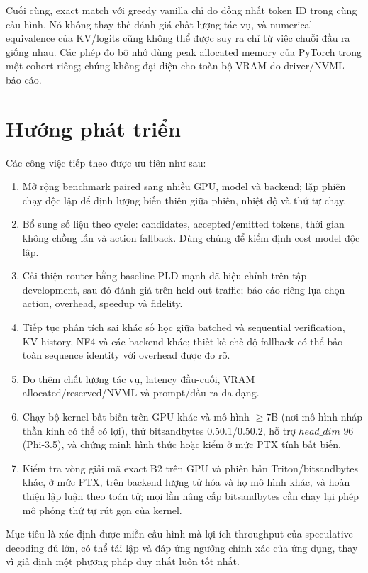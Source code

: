 Cuối cùng, exact match với greedy vanilla chỉ đo đồng nhất token ID trong cùng cấu hình. Nó không thay thế đánh giá chất lượng tác vụ, và numerical equivalence của KV/logits cũng không thể được suy ra chỉ từ việc chuỗi đầu ra giống nhau. Các phép đo bộ nhớ dùng peak allocated memory của PyTorch trong một cohort riêng; chúng không đại diện cho toàn bộ VRAM do driver/NVML báo cáo.

\section{Hướng phát triển}

Các công việc tiếp theo được ưu tiên như sau:
\begin{enumerate}
    \item Mở rộng benchmark paired sang nhiều GPU, model và backend; lặp phiên chạy độc lập để định lượng biến thiên giữa phiên, nhiệt độ và thứ tự chạy.
    \item Bổ sung số liệu theo cycle: candidates, accepted/emitted tokens, thời gian không chồng lấn và action fallback. Dùng chúng để kiểm định cost model độc lập.
    \item Cải thiện router bằng baseline PLD mạnh đã hiệu chỉnh trên tập development, sau đó đánh giá trên held-out traffic; báo cáo riêng lựa chọn action, overhead, speedup và fidelity.
    \item Tiếp tục phân tích sai khác số học giữa batched và sequential verification, KV history, NF4 và các backend khác; thiết kế chế độ fallback có thể bảo toàn sequence identity với overhead được đo rõ.
    \item Đo thêm chất lượng tác vụ, latency đầu-cuối, VRAM allocated/reserved/NVML và prompt/đầu ra đa dạng.
    \item Chạy bộ kernel bất biến trên GPU khác và mô hình $\ge7$B (nơi mô hình nháp thần kinh có thể có lợi), thử bitsandbytes 0.50.1/0.50.2, hỗ trợ $head\_dim$ $96$ (Phi-3.5), và chứng minh hình thức hoặc kiểm ở mức PTX tính bất biến.
    \item Kiểm tra vòng giải mã exact B2 trên GPU và phiên bản Triton/bitsandbytes khác, ở mức PTX, trên backend lượng tử hóa và họ mô hình khác, và hoàn thiện lập luận theo toán tử; mọi lần nâng cấp bitsandbytes cần chạy lại phép mô phỏng thứ tự rút gọn của kernel.
\end{enumerate}

Mục tiêu là xác định được miền cấu hình mà lợi ích throughput của speculative decoding đủ lớn, có thể tái lập và đáp ứng ngưỡng chính xác của ứng dụng, thay vì giả định một phương pháp duy nhất luôn tốt nhất.
